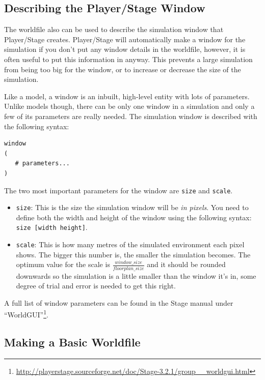 \documentclass[a4paper]{report}
\newcommand{\plst}{Player/Stage\xspace}
\begin{document}
\subsection{Describing the \plst Window} \label{sec:BuildingAWorld:EmptyWorld:PLSTWindow}

The worldfile also can be used to describe the simulation window that \plst creates. \plst will automatically make a window for the simulation if you don't put any window details in the worldfile, however, it is often useful to put this information in anyway. This prevents a large simulation from being too big for the window, or to increase or decrease the size of the simulation.

Like a model, a window is an inbuilt, high-level entity with lots of parameters. Unlike models though, there can be only one window in a simulation and only a few of its parameters are really needed. The simulation window is described with the following syntax:
\begin{verbatim}
window
(
   # parameters...
)
\end{verbatim}

The two most important parameters for the window are \verb|size| and \verb|scale|.
\begin{itemize}
\item \verb|size|: This is the size the simulation window will be \emph{in pixels}. You need to define both the width and height of the window using the following syntax: \verb|size [width height]|. 
\item \verb|scale|: This is how many metres of the simulated environment each pixel shows. The bigger this number is, the smaller the simulation becomes. The optimum value for the scale is $\frac{window\_size}{floorplan\_size}$ and it should be rounded downwards so the simulation is a little smaller than the window it's in, some degree of trial and error is needed to get this right. 
\end{itemize}

A full list of window parameters can be found in the Stage manual under ``WorldGUI''\footnote{\url{http://playerstage.sourceforge.net/doc/Stage-3.2.1/group__worldgui.html}}.

\subsection{Making a Basic Worldfile}\label{sec:BuildingAWorld:EmptyWorld:BasicWorldfile}
\end{document}

